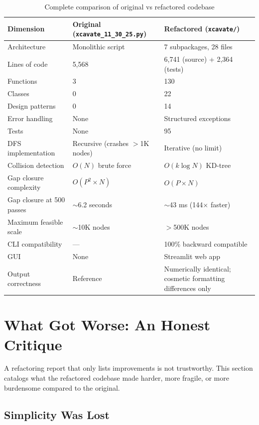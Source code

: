 \documentclass[11pt,a4paper]{article}
\begin{document}
\begin{table}[H]
\centering
\caption{Complete comparison of original vs refactored codebase}
\begin{tabularx}{\textwidth}{lXX}
\toprule
\textbf{Dimension} & \textbf{Original (\texttt{xcavate\_11\_30\_25.py})} & \textbf{Refactored (\texttt{xcavate/})} \\
\midrule
Architecture & Monolithic script & 7 subpackages, 28 files \\
Lines of code & 5,568 & 6,741 (source) + 2,364 (tests) \\
Functions & 3 & 130 \\
Classes & 0 & 22 \\
Design patterns & 0 & 14 \\
Error handling & None & Structured exceptions \\
Tests & None & 95 \\
DFS implementation & Recursive (crashes $>$1K nodes) & Iterative (no limit) \\
Collision detection & $O(N)$ brute force & $O(k \log N)$ KD-tree \\
Gap closure complexity & $O(P^2 \times N)$ & $O(P \times N)$ \\
Gap closure at 500 passes & $\sim$6.2 seconds & $\sim$43 ms (144$\times$ faster) \\
Maximum feasible scale & $\sim$10K nodes & $>$500K nodes \\
CLI compatibility & --- & 100\% backward compatible \\
GUI & None & Streamlit web app \\
Output correctness & Reference & Numerically identical; cosmetic formatting differences only \\
\bottomrule
\end{tabularx}
\end{table}


\section{What Got Worse: An Honest Critique}

A refactoring report that only lists improvements is not trustworthy. This section catalogs what the refactored codebase made harder, more fragile, or more burdensome compared to the original.

\subsection{Simplicity Was Lost}
\end{document}
